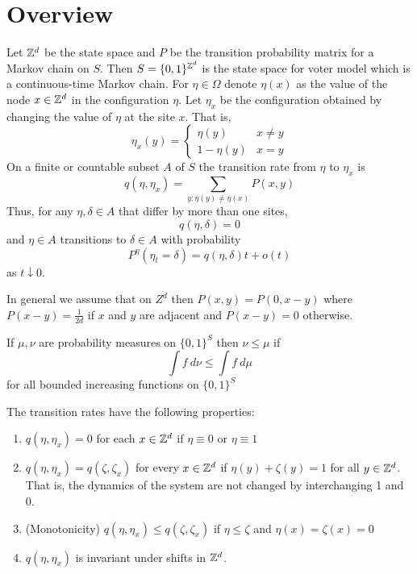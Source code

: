 \section{Overview}

\begin{defn} \cite{Liggett2002}
Let $\mathbb{Z}^d$ be the state space and $P$ be the transition probability matrix for a Markov chain on $S$.
Then $S = \{0,1\}^{\mathbb{Z}^d}$ is the state space for voter model which is a continuous-time Markov chain.
For $\eta \in \Omega$ denote $\eta(x)$ as the value of the node $x \in \mathbb{Z}^d$ in the configuration $\eta$.
Let $\eta_x$ be the configuration obtained by changing the value of $\eta$ at the site $x$. That is,
$$
\eta_x(y) = \begin{cases}
    \eta(y) & x \not = y\\
    1 - \eta(y) & x = y
\end{cases}
$$
On a finite or countable subset $A$ of $S$
the transition rate from $\eta$ to $\eta_x$ is 
$$
q(\eta, \eta_x) = \sum_{y : \eta(y) \not = \eta(x)} P(x,y)
$$
Thus, for any $\eta, \delta \in A$ that differ by more than one sites,
$$
q(\eta, \delta) = 0
$$
and $\eta \in A$ transitions to $\delta \in A$ with probability
$$
P^\eta(\eta_t = \delta) = q(\eta, \delta) t + o(t)
$$
as $t \downarrow 0$.

In general we assume that on $Z^d$ then $P(x,y) = P(0, x - y)$
where $P(x- y) = \frac{1}{2d}$ if $x$ and $y$ are adjacent and $P(x-y) = 0$ otherwise.
\end{defn}

\begin{defn} \cite{Liggett1999}
If $\mu, \nu$ are probability measures on $\{0,1\}^S$ then $\nu \leq \mu$ if
$$
\int f~d\nu \leq \int f~d\mu
$$
for all bounded increasing functions on $\{0,1\}^S$
\end{defn}

\begin{theorem}
The transition rates have the following properties:
\begin{enumerate}
    \item $q(\eta, \eta_x) = 0$ for each $x \in \mathbb{Z}^d$ if $\eta \equiv 0$ or $\eta \equiv 1$
    \item $q(\eta, \eta_x) = q(\zeta, \zeta_x)$ for every $x \in \mathbb{Z}^d$ if $\eta(y) + \zeta(y) = 1$ for all $y \in \mathbb{Z}^d$. That is, the dynamics of the system are not changed by interchanging 1 and 0.
    \item (Monotonicity) $q(\eta, \eta_x) \leq q(\zeta, \zeta_x)$ if $\eta \leq \zeta$ and $\eta(x) = \zeta(x) = 0$
    \item $q(\eta, \eta_x)$ is invariant under shifts in $\mathbb{Z}^d$.
\end{enumerate}
\end{theorem}


